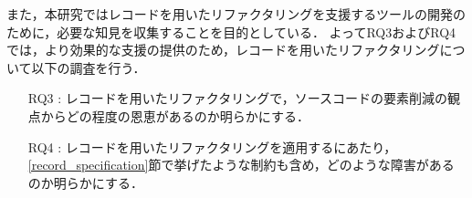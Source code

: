 また，本研究ではレコードを用いたリファクタリングを支援するツールの開発のために，必要な知見を収集することを目的としている．
よってRQ3およびRQ4では，より効果的な支援の提供のため，レコードを用いたリファクタリングについて以下の調査を行う．
\begin{itemize}
    \item[RQ3 : ] レコードを用いたリファクタリングで，ソースコードの要素削減の観点からどの程度の恩恵があるのか明らかにする．
    \item[RQ4 : ] レコードを用いたリファクタリングを適用するにあたり，\ref{record_specification}節で挙げたような制約も含め，どのような障害があるのか明らかにする．
\end{itemize}
